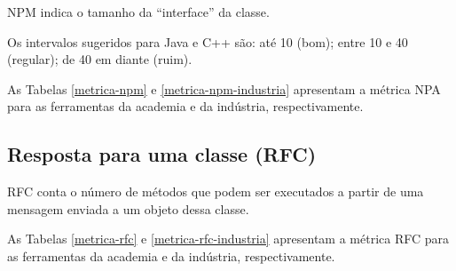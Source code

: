NPM indica o tamanho da ``interface'' da classe.

Os intervalos sugeridos para Java e C++ são: até 10 (bom); entre 10 e 40
(regular); de 40 em diante (ruim).

As Tabelas \ref{metrica-npm} e \ref{metrica-npm-industria} apresentam a
métrica NPA para as ferramentas da academia e da indústria, respectivamente.



\subsection{Resposta para uma classe (RFC)}

RFC conta o número de métodos que podem ser executados a partir de uma
mensagem enviada a um objeto dessa classe.

As Tabelas \ref{metrica-rfc} e \ref{metrica-rfc-industria} apresentam a
métrica RFC para as ferramentas da academia e da indústria, respectivamente.


